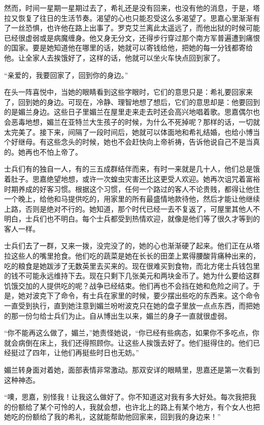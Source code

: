 \par 然而，时间一星期一星期过去了，希礼还是没有回来，也没有他的消息，于是，塔拉又恢复了往日的生活节奏。渴望的心也只能忍受这么多渴望了。思嘉心里渐渐有了一丝恐惧，也许他在路上出事了。罗克艾兰离此太遥远了，而他出狱的时候可能已经很虚弱或是病魔缠身。他又身无分文，还得步行穿过那个南方军普遍遭到痛恨的国家。要是她知道他在哪里的话，她就可以寄钱给他，把她的每一分钱都寄给他。让全家人去挨饿好了，这样的话，他就可以坐火车快点回到家了。
\par “亲爱的，我要回家了，回到你的身边。”
\par 在头一阵喜悦中，当她的眼睛看到这些字眼时，它们的意思只是：希礼要回家来了，回到她的身边。可现在，冷静、理智地想了想后，它们的意思却是：他要回到的是媚兰身边。这些日子里媚兰在屋里走来走去时还会高兴地唱着歌。思嘉偶尔也会恶毒地想，媚兰在亚特兰大生孩子的时候，为什么不死掉呢？那样的话，一切就太完美了。接下来，间隔了一段时间后，她就可以体面地和希礼结婚，也给小博当个好继母。有这些念头的时候，她也不会赶快向上帝祈祷，告诉他说自己不是当真的。她再也不怕上帝了。
\par 士兵们有的独自一人，有的三五成群结伴而来，有时一来就是几十人，他们总是饿着肚子。思嘉绝望地想，或许一次蝗虫灾害还比这更受人欢迎。她再次诅咒着富裕时期养成的好客习惯。根据这个习惯，任何一个路过的客人不论贵贱，都得让他住一个晚上，给他和马提供吃的，用家里的所有最盛情地款待他，然后才能让他继续上路，否则是绝对不行的。她知道，那个时代已经一去不复返了，可屋里其他人不明白，士兵们也不明白。每个士兵都受到热情欢迎，就像是他们等了很久才等到的客人一样。
\par 士兵们去了一群，又来一拨，没完没了的，她的心也渐渐硬了起来。他们正在从塔拉这些人的嘴里抢食。他们吃的蔬菜是她在长长的田垄上累得腰酸背痛种出来的，吃的粮食是她跋涉了无数英里去买来的。现在很难买到食物，而北方佬士兵钱包里的钱不可能永远维持下去。现在只剩下几张美元和两块金币了。她为什么要给这群饥饿交加的人提供吃的呢？战争已经结束。他们再也不会挡在她和危险之间了。于是，她对波克下了命令，有士兵在家里的时候，要少摆出些吃的东西来。这个命令一直受到执行，直到她注意到媚兰吩咐波克只在她的盘子里放一点点东西，而把她的那一份匀给士兵们为止。自从博出生以来，媚兰的身子一直就很虚弱。
\par “你不能再这么做了，媚兰，”她责怪她说，“你已经有些病态，如果你不多吃点，你就会病倒在床上，我们还得照顾你。让这些人挨饿去好了。他们挺得住的。他们已经挺过了四年，让他们再挺些时日也无妨。”
\par 媚兰转身面对着她，面部表情非常激动。那双安详的眼睛里，思嘉还是第一次看到这种神态。
\par “噢，思嘉，别怪我！让我这么做好了。你不知道这对我有多大好处。每次我把我的份额给了某个可怜的人，我就会想，也许北上的路上有某个地方，有个女人也把她吃的份额给了我的希礼，这就能帮助他回家来，回到我的身边来！”
